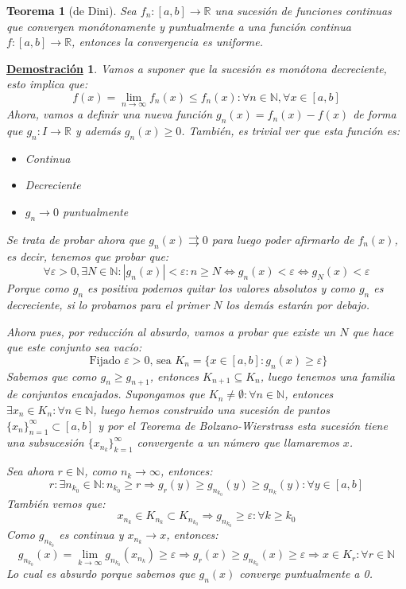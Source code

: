 \documentclass[10pt,a4paper,openright]{book}
\theoremstyle{break}
\newtheorem{theo}{Teorema}[chapter]
\newtheorem*{demo}{\underline{Demostración}}
\begin{document}
\begin{theo}[de Dini]
Sea $f_n  : [a,b] \to \mathbb{R}$ una sucesión de funciones continuas que convergen monótonamente y puntualmente a una función continua $f: [a,b] \to \mathbb{R}$, entonces la convergencia es uniforme.
\end{theo}
\begin{demo}
Vamos a suponer que la sucesión es monótona decreciente, esto implica que:
$$f(x) = \lim_{n \to \infty} f_n (x) \leq f_n (x) : \forall n \in \mathbb N, \forall x \in [a,b]$$
Ahora, vamos a definir una nueva función $g_n(x) = f_n(x)-f(x)$ de forma que $g_n : I \rightarrow \mathbb R$ y además $g_n(x) \geq 0$. También, es trivial ver que esta función es:
\begin{itemize}
\item Continua
\item Decreciente
\item $g_n \rightarrow 0$ puntualmente
\end{itemize}
Se trata de probar ahora que $g_n(x)\rightrightarrows 0$ para luego poder afirmarlo de $f_n(x)$, es decir, tenemos que probar que:
$$ \forall \varepsilon > 0, \exists N \in \mathbb{N} : |g_n (x)| < \varepsilon : n \geq N \Leftrightarrow g_n(x) < \varepsilon \Leftrightarrow g_N(x)< \varepsilon$$
Porque como $g_n$ es positiva podemos quitar los valores absolutos y como $g_n$ es decreciente, si lo probamos para el primer $N$ los demás estarán por debajo.

Ahora pues, por reducción al absurdo, vamos a probar que existe un $N$ que hace que este conjunto sea vacío:
$$ \mbox{ Fijado $\varepsilon >0$, sea }K_n = \{ x \in [a,b] : g_n (x) \geq \varepsilon\}$$
Sabemos que como $g_n \geq g_{n+1}$, entonces $K_{n+1} \subseteq K_n$, luego tenemos una familia de conjuntos encajados. Supongamos que $K_n \neq \emptyset: \forall n \in \mathbb N$, entonces $\exists x_n \in K_n: \forall n \in \mathbb N$, luego hemos construido una sucesión de puntos $\{x_n\}_{n=1}^\infty \subset [a,b]$ y por el Teorema de Bolzano-Wierstrass esta sucesión tiene una subsucesión $\{x_{n_k}\}_{k=1}^\infty$ convergente a un número que llamaremos $x$.

Sea ahora $r\in \mathbb N$, como $n_k \rightarrow \infty$, entonces:
$$r: \exists n_{k_0}\in \mathbb N: n_{k_0} \geq r \Rightarrow g_r(y)\geq g_{n_{k_0}}(y) \geq g_{n_k}(y) : \forall y \in [a,b]$$
También vemos que:
$$x_{n_k}\in K_{n_k} \subset K_{n_{k_0}} \Rightarrow g_{n_{k_0}}\geq \varepsilon : \forall k \geq k_0$$
Como $g_{n_{k_0}}$ es continua y $x_{n_k}\rightarrow x$, entonces:
$$g_{n_{k_0}} (x) = \lim_{k \to \infty} g_{n_{k_0}} (x_{n_k}) \geq \varepsilon \Rightarrow g_r (x) \geq g_{n_{k_0}} (x) \geq \varepsilon \Rightarrow x \in K_r : \forall r \in \mathbb{N}$$
Lo cual es absurdo porque sabemos que $g_n(x)$ converge puntualmente a 0.
\end{demo}
\end{document}
